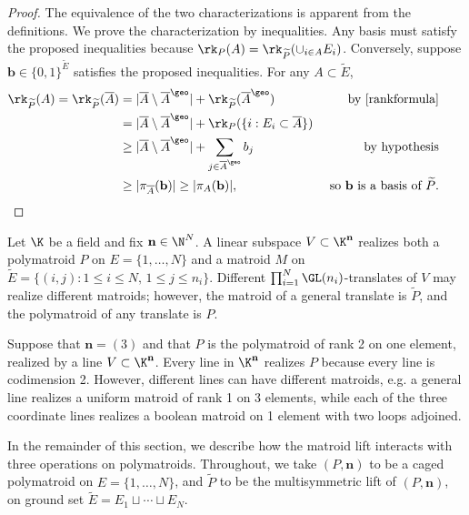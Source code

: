 \begin{proof}
  The equivalence of the two characterizations is apparent from the definitions. We prove the characterization by inequalities.
  Any basis must satisfy the proposed inequalities because $\rk_P(A) = \rk_{\widetilde P}(\cup_{i \in A} E_i)$.
  Conversely, suppose $\mathbf b \in \{0,1\}^{\widetilde E}$ satisfies the proposed inequalities. For any  $A \subset \widetilde E$,
  \begin{align*}
    \rk_{\widetilde P}(A) = \rk_{\widetilde P}(\overline{A})
    &= |\overline A \setminus {\overline A}^\geo| + \rk_{\widetilde P}(\overline A^\geo) & \text{ by \cref{rankformula}}&\\
    & = |\overline A \setminus {\overline A}^\geo| + \rk_P(\{i : E_i \subset \overline A\})  &\\
    &\geq |\overline A \setminus {\overline A}^\geo| + \sum_{j \in {\overline A}^\geo} b_j & \text{by hypothesis}&\\
    &\geq |\pi_{\overline A}(\mathbf b)| \geq |\pi_A(\mathbf b)|, & \text{  so $\mathbf b$ is a basis of $\widetilde P$.} &\qquad \qedhere
  \end{align*}
\end{proof}

\begin{rema}\label{realizablelift}
  Let $\K$ be a field and fix $\mathbf n \in \N^N$.
  A linear subspace $V \subset \K^{\mathbf n}$ realizes both a polymatroid $P$ on $E = \{1, \ldots, N\}$ and a matroid $M$ on $\widetilde E = \{(i,j) : 1 \leq i \leq N, \, 1 \leq j \leq n_i\}$.
  Different  $\prod_{i=1}^N \GL(n_i)$-translates of $V$ may realize different matroids; however, the matroid of a general translate is $\widetilde P$, and the polymatroid of any translate is $P$.
\end{rema}
\begin{exam}
  Suppose that $\mathbf n = (3)$ and that $P$ is the polymatroid of rank 2 on one element, realized by a line $V \subset \K^{\mathbf n}$. Every line in $\K^{\mathbf n}$ realizes $P$ because every line is codimension 2. However, different lines can have different matroids, e.g. a general line realizes a uniform matroid of rank 1 on 3 elements, while each of the three coordinate lines realizes a boolean matroid on 1 element with two loops adjoined.
\end{exam}

In the remainder of this section, we describe how the matroid lift interacts with three operations on polymatroids.
Throughout, we take $(P, \mathbf n)$ to be a caged polymatroid on $E = \{1, \ldots, N\}$, and $\widetilde P$ to be the multisymmetric lift of $(P, \mathbf n)$, on ground set $\widetilde E = E_1 \sqcup \cdots \sqcup E_N$.
